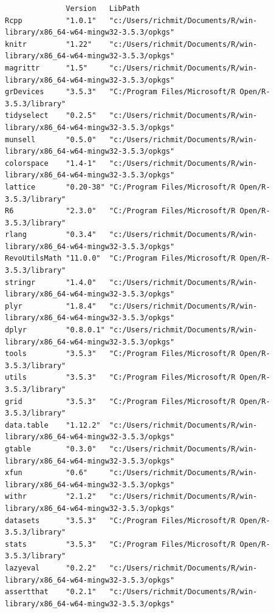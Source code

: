 \documentclass[11pt]{article}
\begin{document}
\begin{verbatim}
              Version   LibPath                                                                  
Rcpp          "1.0.1"   "c:/Users/richmit/Documents/R/win-library/x86_64-w64-mingw32-3.5.3/opkgs"
knitr         "1.22"    "c:/Users/richmit/Documents/R/win-library/x86_64-w64-mingw32-3.5.3/opkgs"
magrittr      "1.5"     "c:/Users/richmit/Documents/R/win-library/x86_64-w64-mingw32-3.5.3/opkgs"
grDevices     "3.5.3"   "C:/Program Files/Microsoft/R Open/R-3.5.3/library"                      
tidyselect    "0.2.5"   "c:/Users/richmit/Documents/R/win-library/x86_64-w64-mingw32-3.5.3/opkgs"
munsell       "0.5.0"   "c:/Users/richmit/Documents/R/win-library/x86_64-w64-mingw32-3.5.3/opkgs"
colorspace    "1.4-1"   "c:/Users/richmit/Documents/R/win-library/x86_64-w64-mingw32-3.5.3/opkgs"
lattice       "0.20-38" "C:/Program Files/Microsoft/R Open/R-3.5.3/library"                      
R6            "2.3.0"   "C:/Program Files/Microsoft/R Open/R-3.5.3/library"                      
rlang         "0.3.4"   "c:/Users/richmit/Documents/R/win-library/x86_64-w64-mingw32-3.5.3/opkgs"
RevoUtilsMath "11.0.0"  "C:/Program Files/Microsoft/R Open/R-3.5.3/library"                      
stringr       "1.4.0"   "c:/Users/richmit/Documents/R/win-library/x86_64-w64-mingw32-3.5.3/opkgs"
plyr          "1.8.4"   "c:/Users/richmit/Documents/R/win-library/x86_64-w64-mingw32-3.5.3/opkgs"
dplyr         "0.8.0.1" "c:/Users/richmit/Documents/R/win-library/x86_64-w64-mingw32-3.5.3/opkgs"
tools         "3.5.3"   "C:/Program Files/Microsoft/R Open/R-3.5.3/library"                      
utils         "3.5.3"   "C:/Program Files/Microsoft/R Open/R-3.5.3/library"                      
grid          "3.5.3"   "C:/Program Files/Microsoft/R Open/R-3.5.3/library"                      
data.table    "1.12.2"  "c:/Users/richmit/Documents/R/win-library/x86_64-w64-mingw32-3.5.3/opkgs"
gtable        "0.3.0"   "c:/Users/richmit/Documents/R/win-library/x86_64-w64-mingw32-3.5.3/opkgs"
xfun          "0.6"     "c:/Users/richmit/Documents/R/win-library/x86_64-w64-mingw32-3.5.3/opkgs"
withr         "2.1.2"   "c:/Users/richmit/Documents/R/win-library/x86_64-w64-mingw32-3.5.3/opkgs"
datasets      "3.5.3"   "C:/Program Files/Microsoft/R Open/R-3.5.3/library"                      
stats         "3.5.3"   "C:/Program Files/Microsoft/R Open/R-3.5.3/library"                      
lazyeval      "0.2.2"   "c:/Users/richmit/Documents/R/win-library/x86_64-w64-mingw32-3.5.3/opkgs"
assertthat    "0.2.1"   "c:/Users/richmit/Documents/R/win-library/x86_64-w64-mingw32-3.5.3/opkgs"

\end{verbatim}
\end{document}
